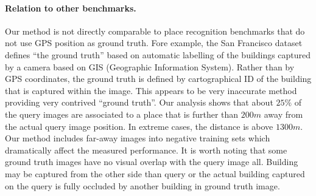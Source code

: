       \paragraph{Relation to other benchmarks.}
      \textcolor{petr}{
        Our method is not directly comparable to place recognition benchmarks that do not use GPS position as ground truth.
        Fore example, the San Francisco dataset~\cite{Chen11} defines “the ground truth” based on automatic labelling of the buildings captured by a camera based on GIS (Geographic Information System). Rather than by GPS coordinates, the ground truth is defined by cartographical ID of the building that is captured within the image. This appears to be very inaccurate method providing very contrived “ground truth”. Our analysis shows that about $25\%$ of the query images are associated to a place that is further than $200m$ away from the actual query image position. In extreme cases, the distance is above $1300m$. Our method includes far-away images into negative training sets which dramatically affect the measured performance. It is worth noting that some ground truth images have no visual overlap with the query image all. Building may be captured from the other side than query or the actual building captured on the query is fully occluded by another building in ground truth image.
      }

      
